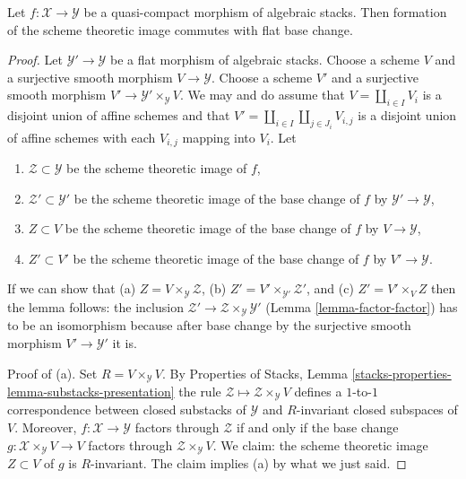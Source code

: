 %
\begin{lemma}
\label{lemma-existence-plus-flat-base-change}
Let $f : \mathcal{X} \to \mathcal{Y}$ be a quasi-compact
morphism of algebraic stacks. Then formation of the scheme theoretic image
commutes with flat base change.
\end{lemma}

\begin{proof}
Let $\mathcal{Y}' \to \mathcal{Y}$ be a flat morphism of algebraic stacks.
Choose a scheme $V$ and a surjective smooth morphism $V \to \mathcal{Y}$.
Choose a scheme $V'$ and a
surjective smooth morphism $V' \to \mathcal{Y}' \times_\mathcal{Y} V$.
We may and do assume that $V = \coprod_{i \in I} V_i$ is a disjoint
union of affine schemes and that
$V' = \coprod_{i \in I} \coprod_{j \in J_i} V_{i, j}$
is a disjoint union of affine schemes with each $V_{i, j}$ mapping into $V_i$.
Let
\begin{enumerate}
\item $\mathcal{Z} \subset \mathcal{Y}$ be the scheme theoretic image of $f$,
\item $\mathcal{Z}' \subset \mathcal{Y}'$ be the scheme theoretic image
of the base change of $f$ by $\mathcal{Y}' \to \mathcal{Y}$,
\item $Z \subset V$ be the scheme theoretic image
of the base change of $f$ by $V \to \mathcal{Y}$,
\item $Z' \subset V'$ be the scheme theoretic image
of the base change of $f$ by $V' \to \mathcal{Y}$.
\end{enumerate}
If we can show that
(a) $Z = V \times_\mathcal{Y} \mathcal{Z}$,
(b) $Z' = V' \times_{\mathcal{Y}'} \mathcal{Z}'$, and
(c) $Z' = V' \times_V Z$
then the lemma follows: the inclusion
$\mathcal{Z}' \to \mathcal{Z} \times_\mathcal{Y} \mathcal{Y}'$
(Lemma \ref{lemma-factor-factor})
has to be an isomorphism because after base change by the surjective
smooth morphism $V' \to \mathcal{Y}'$ it is.

\medskip\noindent
Proof of (a). Set $R = V \times_\mathcal{Y} V$.
By Properties of Stacks, Lemma
\ref{stacks-properties-lemma-substacks-presentation}
the rule $\mathcal{Z} \mapsto \mathcal{Z} \times_\mathcal{Y} V$
defines a $1$-to-$1$ correspondence between closed substacks
of $\mathcal{Y}$ and $R$-invariant closed subspaces of $V$.
Moreover, $f : \mathcal{X} \to \mathcal{Y}$ factors through $\mathcal{Z}$
if and only if the base change
$g : \mathcal{X} \times_\mathcal{Y} V \to V$ factors through
$\mathcal{Z} \times_\mathcal{Y} V$.
We claim: the scheme theoretic image $Z \subset V$ of $g$
is $R$-invariant. The claim implies (a) by what we just said.


\end{proof}
